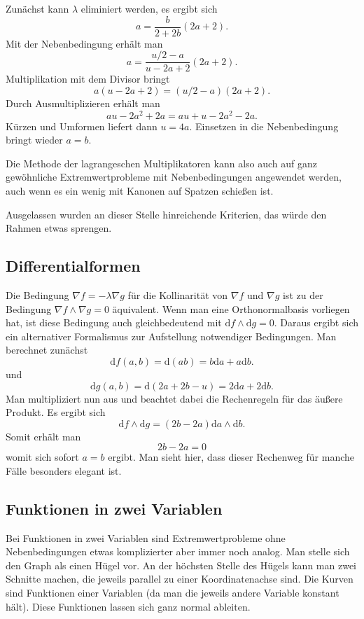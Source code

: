 \documentclass[a4paper,11pt,fleqn,twocolumn]{article}
\begin{document}
Zunächst kann \(\lambda\) eliminiert werden, es ergibt sich
\[a=\frac{b}{2+2b}(2a+2).\]
Mit der Nebenbedingung erhält man
\[a=\frac{u/2-a}{u-2a+2}(2a+2).\]
Multiplikation mit dem Divisor bringt
\[a(u-2a+2)=(u/2-a)(2a+2).\]
Durch Ausmultiplizieren erhält man
\[au-2a^2+2a = au+u-2a^2-2a.\]
Kürzen und Umformen liefert dann \(u=4a\). Einsetzen
in die Nebenbedingung bringt wieder \(a=b\).

Die Methode der lagrangeschen Multiplikatoren kann also auch auf
ganz gewöhnliche Extremwertprobleme mit Nebenbedingungen angewendet
werden, auch wenn es ein wenig mit Kanonen auf Spatzen schießen ist.

Ausgelassen wurden an dieser Stelle hinreichende Kriterien,
das würde den Rahmen etwas sprengen.

\subsection*{Differentialformen}

Die Bedingung \(\nabla f=-\lambda\nabla g\) für die Kollinarität von \(\nabla f\) und \(\nabla g\) ist zu der Bedingung \(\nabla f\wedge\nabla g=0\) äquivalent. Wenn man eine Orthonormalbasis vorliegen hat, ist diese Bedingung auch gleichbedeutend mit \(\mathrm df\wedge\mathrm dg=0\).
Daraus ergibt sich ein alternativer Formalismus
zur Aufstellung notwendiger Bedingungen. Man berechnet zunächst
\[\mathrm df(a,b) = \mathrm d(ab) = b\mathrm da+a\mathrm db.\]
und
\[\mathrm dg(a,b) = \mathrm d(2a+2b-u) = 2\mathrm da+2\mathrm db.\]
Man multipliziert nun aus und beachtet dabei die Rechenregeln
für das äußere Produkt. Es ergibt sich
\[\mathrm df\wedge\mathrm dg
= (2b-2a)\mathrm da\wedge\mathrm db.\]
Somit erhält man
\[2b-2a=0\]
womit sich sofort \(a=b\) ergibt. Man sieht hier, dass dieser Rechenweg für manche Fälle besonders elegant ist.

\subsection*{Funktionen in zwei Variablen}

Bei Funktionen in zwei Variablen sind Extremwertprobleme ohne
Nebenbedingungen etwas komplizierter aber immer noch analog.
Man stelle sich den Graph
als einen Hügel vor. An der höchsten Stelle des Hügels kann man
zwei Schnitte machen, die jeweils parallel zu einer Koordinatenachse
sind. Die Kurven sind Funktionen einer Variablen (da man
die jeweils andere Variable konstant hält). Diese Funktionen lassen
sich ganz normal ableiten.
\end{document}

